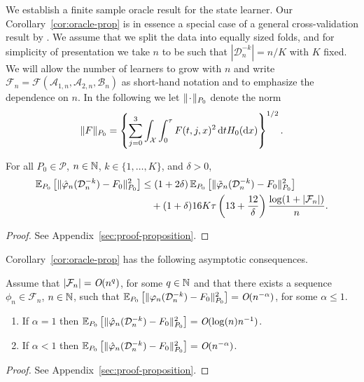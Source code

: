 \documentclass[a4,danish]{article}
\newcommand{\data}{\ensuremath{\mathcal{D}}}
\begin{document}
We establish a finite sample oracle result for the state learner.
Our Corollary~\ref{cor:oracle-prop} is in essence a special case of a
general cross-validation result by \cite{vaart2006oracle}. We assume
that we split the data into equally sized folds, and for simplicity of
presentation we take \( n \) to be such that
\( |\data_n^{-k}| = n/K \) with \( K \) fixed. We will allow the
number of learners to grow with \( n \) and write
\( \mathcal{F}_n=\mathcal{F}(\mathcal{A}_{1,n}, \mathcal{A}_{2,n},
\mathcal{B}_n)\) as short-hand notation and to emphasize the
dependence on \( n \).
In the following we let \( \| \blank \|_{P_0} \) denote the norm
\begin{equation}
  \label{eq:norm}
  \| F \|_{P_0} = 
  \left\{
    \sum_{j=0}^{3}\int_{\mathcal{X}} \int_0^{\tau} F(t, j, x)^2 \mathop{}\!\mathrm{d} t H_0( \mathop{}\!\mathrm{d} x)
  \right\}^{1/2}.
\end{equation}
\begin{corollary}
  \label{cor:oracle-prop}
  For all \(P_0\in\mathcal{P}\), \( n \in \mathbb{N} \), \( k \in \{1, \dots, K\} \),
  and $\delta>0$,
  \begin{align*}
    \E_{P_0}{\left[ \Vert \hat{\phi}_n(\data_n^{-k}) - F_0 \Vert_{P_0}^2 \right]}
    & \leq (1 + 2\delta)
      \E_{P_0}{\left[ \Vert \tilde{\phi}_n(\data_n^{-k}) - F_0 \Vert_{P_0}^2 \right]}
    \\
    & \quad
      + (1+ \delta) 16   K \tau
      \left(
      13 + \frac{12}{\delta}
      \right)
      \frac{\log(1 + |\mathcal{F}_n|)}{n}.
  \end{align*}
\end{corollary}
\begin{proof}
  See Appendix~\ref{sec:proof-proposition}.
\end{proof}

Corollary~\ref{cor:oracle-prop} has the following asymptotic consequences.

\begin{corollary}
  \label{cor:asymp-cons}
  Assume that \( |\mathcal{F}_n| = \textit{O}(n^q)\), for some \( q \in \mathbb{N} \)
  and that there exists a sequence \( \phi_n \in \mathcal{F}_n \),
  \( n \in \mathbb{N} \), such that
  \( \E_{P_0}{\left[ \Vert \phi_n(\data_n^{-k}) - F_{0} \Vert_{P_0}^2 \right]} =
  \bigO(n^{-\alpha}) \), for some \( \alpha\leq 1 \).
  \begin{enumerate}[label=(\roman*), topsep=0pt]
  \item If $\alpha=1$ then
    \( \E_{P_0}{\left[ \Vert \hat{\phi}_n(\data_n^{-k}) - F_0 \Vert_{P_0}^2
      \right]} = \bigO(\log(n)n^{-1}) \).
  \item If $\alpha<1$ then
    \( \E_{P_0}{\left[ \Vert \hat{\phi}_n(\data_n^{-k}) - F_0 \Vert_{P_0}^2 \right]} =
    \bigO(n^{-\alpha}) \).
  \end{enumerate}
\end{corollary}
\begin{proof}
  See Appendix~\ref{sec:proof-proposition}.
\end{proof}
\end{document}
